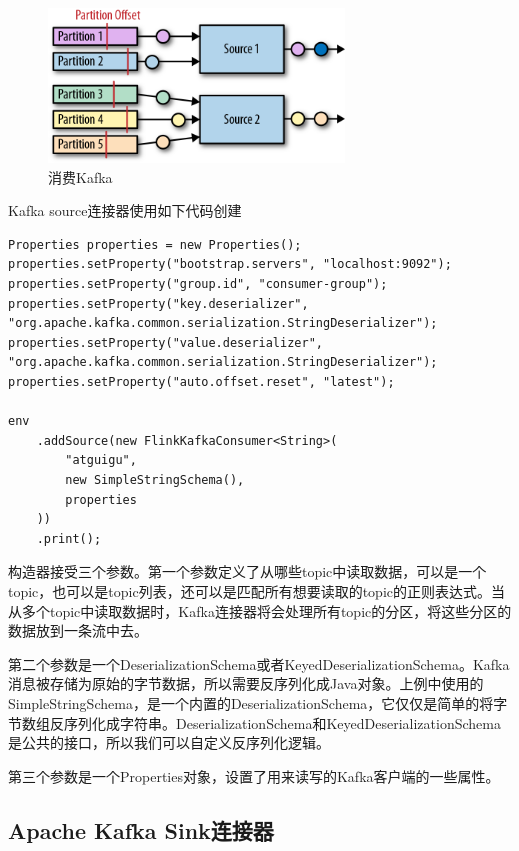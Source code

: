 \documentclass[cn,11pt,chinese]{elegantbook}
\begin{document}
\begin{figure}[htbp]
    \centering
    \includegraphics[width=0.7\textwidth]{images/spaf_0801.png}
    \caption{消费Kafka}
\end{figure}

Kafka source连接器使用如下代码创建

\begin{verbatim}
Properties properties = new Properties();
properties.setProperty("bootstrap.servers", "localhost:9092");
properties.setProperty("group.id", "consumer-group");
properties.setProperty("key.deserializer", "org.apache.kafka.common.serialization.StringDeserializer");
properties.setProperty("value.deserializer", "org.apache.kafka.common.serialization.StringDeserializer");
properties.setProperty("auto.offset.reset", "latest");

env
    .addSource(new FlinkKafkaConsumer<String>(
        "atguigu",
        new SimpleStringSchema(),
        properties
    ))
    .print();
\end{verbatim}

构造器接受三个参数。第一个参数定义了从哪些topic中读取数据，可以是一个topic，也可以是topic列表，还可以是匹配所有想要读取的topic的正则表达式。当从多个topic中读取数据时，Kafka连接器将会处理所有topic的分区，将这些分区的数据放到一条流中去。

第二个参数是一个DeserializationSchema或者KeyedDeserializationSchema。Kafka消息被存储为原始的字节数据，所以需要反序列化成Java对象。上例中使用的SimpleStringSchema，是一个内置的DeserializationSchema，它仅仅是简单的将字节数组反序列化成字符串。DeserializationSchema和KeyedDeserializationSchema是公共的接口，所以我们可以自定义反序列化逻辑。

第三个参数是一个Properties对象，设置了用来读写的Kafka客户端的一些属性。

\subsection{Apache Kafka Sink连接器}
\end{document}
